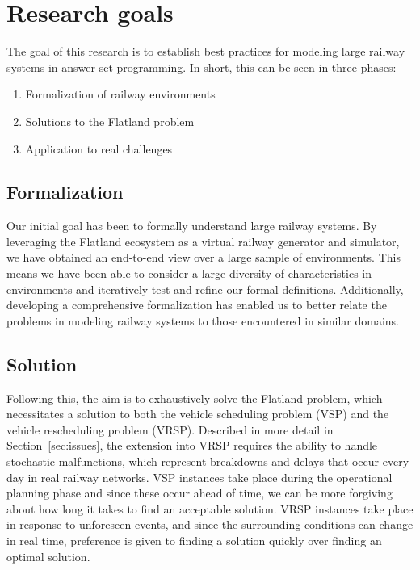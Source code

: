 \section{Research goals}\label{sec:goal}

The goal of this research is to establish best practices for modeling large railway systems in answer set programming.
In short, this can be seen in three phases:
\begin{enumerate}
	\item Formalization of railway environments
	\item Solutions to the Flatland problem
	\item Application to real challenges 
\end{enumerate}
	
\subsection{Formalization}
Our initial goal has been to formally understand large railway systems.
By leveraging the Flatland ecosystem
as a virtual railway generator and simulator,
we have obtained an end-to-end view
over a large sample of environments.
This means we have been able to 
consider a large diversity of characteristics in environments
and iteratively test and refine our formal definitions.
Additionally, developing a comprehensive formalization
has enabled us to better relate the problems in modeling railway systems 
to those encountered in similar domains.

\subsection{Solution}
Following this, the aim is to exhaustively solve the Flatland problem,
which necessitates a solution to both the 
vehicle scheduling problem (VSP) and
the vehicle rescheduling problem (VRSP).
Described in more detail in Section~\ref{sec:issues},
the extension into VRSP requires the ability to handle
stochastic malfunctions,
which represent breakdowns and delays that occur every day
in real railway networks.
VSP instances take place during the operational planning phase
and since these occur ahead of time,
we can be more forgiving about how long it takes to find an acceptable solution.
VRSP instances take place in response to unforeseen events,
and since the surrounding conditions can change in real time,
preference is given to finding a solution quickly
over finding an optimal solution.

